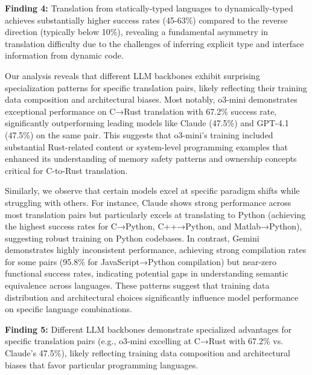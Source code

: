 \begin{myboxc} \textbf{Finding 4: }
Translation from statically-typed languages to dynamically-typed achieves substantially higher success rates (45-63\%) compared to the reverse direction (typically below 10\%), revealing a fundamental asymmetry in translation difficulty due to the challenges of inferring explicit type and interface information from dynamic code.
\end{myboxc}

Our analysis reveals that different LLM backbones exhibit surprising specialization patterns for specific translation pairs, likely reflecting their training data composition and architectural biases. Most notably, o3-mini demonstrates exceptional performance on C→Rust translation with 67.2\% success rate, significantly outperforming leading models like Claude (47.5\%) and GPT-4.1 (47.5\%) on the same pair. This suggests that o3-mini's training included substantial Rust-related content or system-level programming examples that enhanced its understanding of memory safety patterns and ownership concepts critical for C-to-Rust translation.

Similarly, we observe that certain models excel at specific paradigm shifts while struggling with others. For instance, Claude shows strong performance across most translation pairs but particularly excels at translating to Python (achieving the highest success rates for C→Python, C++→Python, and Matlab→Python), suggesting robust training on Python codebases. In contrast, Gemini demonstrates highly inconsistent performance, achieving strong compilation rates for some pairs (95.8\% for JavaScript→Python compilation) but near-zero functional success rates, indicating potential gaps in understanding semantic equivalence across languages. These patterns suggest that training data distribution and architectural choices significantly influence model performance on specific language combinations.

\begin{myboxc} \textbf{Finding 5: }
Different LLM backbones demonstrate specialized advantages for specific translation pairs (e.g., o3-mini excelling at C→Rust with 67.2\% vs. Claude's 47.5\%), likely reflecting training data composition and architectural biases that favor particular programming languages.
\end{myboxc}



